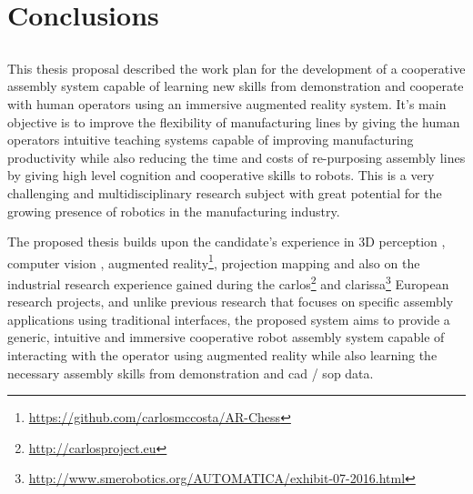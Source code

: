 \chapter{Conclusions}\label{chap:conclusions-and-future-work}



\section*{}

This thesis proposal described the work plan for the development of a cooperative assembly system capable of learning new skills from demonstration and cooperate with human operators using an immersive augmented reality system. It's main objective is to improve the flexibility of manufacturing lines by giving the human operators intuitive teaching systems capable of improving manufacturing productivity while also reducing the time and costs of re-purposing assembly lines by giving high level cognition and cooperative skills to robots. This is a very challenging and multidisciplinary research subject with great potential for the growing presence of robotics in the manufacturing industry.

The proposed thesis builds upon the candidate's experience in 3D perception \cite{Costa2015Diss,Costa2015ICIT,Costa2015Intech,Costa2016Elsevier}, computer vision \cite{Costa2018,Costa2016ICARSC}, augmented reality\footnote{\url{https://github.com/carlosmccosta/AR-Chess}}, projection mapping and also on the industrial research experience gained during the \gls{carlos}\footnote{\url{http://carlosproject.eu}} and \gls{clarissa}\footnote{\url{http://www.smerobotics.org/AUTOMATICA/exhibit-07-2016.html}} European research projects, and unlike previous research that focuses on specific assembly applications using traditional interfaces, the proposed system aims to provide a generic, intuitive and immersive cooperative robot assembly system capable of interacting with the operator using augmented reality while also learning the necessary assembly skills from demonstration and \gls{cad} / \gls{sop} data.